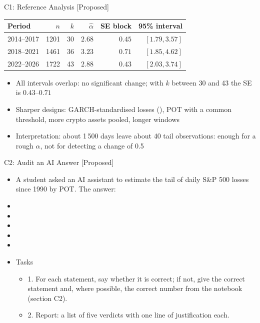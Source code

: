 \ifsolutions
\begin{frame}{C1: Reference Analysis [Proposed]}
\itemsize{\footnotesize}
\begin{center}
\footnotesize
\begin{tabular}{lrrrrr}
\toprule
Period & $n$ & $k$ & $\hat\alpha$ & SE block & 95\% interval \\
\midrule
2014--2017 & 1201 & 30 & $2.68$ & $0.45$ & $[1.79, 3.57]$ \\
2018--2021 & 1461 & 36 & $3.23$ & $0.71$ & $[1.85, 4.62]$ \\
2022--2026 & 1722 & 43 & $2.88$ & $0.43$ & $[2.03, 3.74]$ \\
\bottomrule
\end{tabular}
\end{center}
\begin{itemize}
    \item All intervals overlap: no significant change; with $k$ between 30 and 43 the SE is $0.43$--$0.71$
    \item Sharper designs: GARCH-standardised losses (), POT with a common threshold, more crypto assets pooled, longer windows
    \item Interpretation: about 1\,500 days leave about 40 tail observations: enough for a rough $\alpha$, not for detecting a change of 0.5
\end{itemize}
\end{frame}
\fi

\begin{frame}{C2: Audit an AI Answer [Proposed]}
\itemsize{\scriptsize}
\begin{itemize}
    \item A student asked an AI assistant to estimate the tail of daily S\&P 500 losses since 1990 by POT. The answer:
    \item {}
    \item {}
    \item {}
    \item {}
    \item {}
    \item Tasks
    \begin{itemize}
        \item 1. For each statement, say whether it is correct; if not, give the correct statement and, where possible, the correct number from the notebook (section C2).
        \item 2. Report: a list of five verdicts with one line of justification each.
    \end{itemize}
\end{itemize}
\end{frame}

